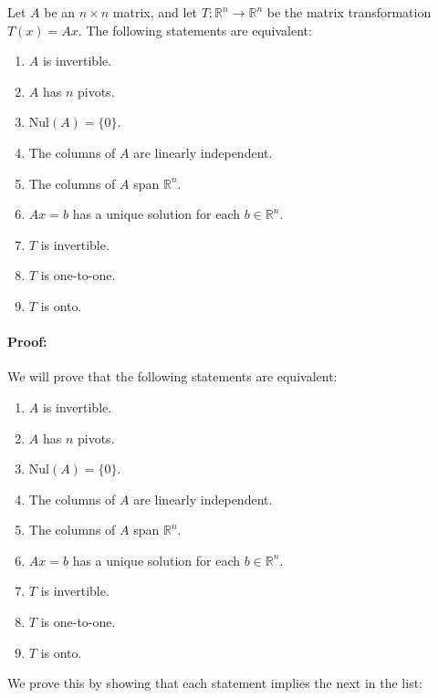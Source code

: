 \documentclass[a4paper,12pt]{article}
\begin{document}
\begin{tcolorbox}[title=Definition,colframe=blue!70!black, colback=blue!5!white]
Let \( A \) be an \( n \times n \) matrix, and let \( T: \mathbb{R}^n \to \mathbb{R}^n \) be the matrix transformation \( T(x) = Ax \). The following statements are equivalent:

\begin{enumerate}
    \item \( A \) is invertible.
    \item \( A \) has \( n \) pivots.
    \item \( \text{Nul}(A) = \{0\} \).
    \item The columns of \( A \) are linearly independent.
    \item The columns of \( A \) span \( \mathbb{R}^n \).
    \item \( Ax = b \) has a unique solution for each \( b \in \mathbb{R}^n \).
    \item \( T \) is invertible.
    \item \( T \) is one-to-one.
    \item \( T \) is onto.
\end{enumerate}
\end{tcolorbox}
\paragraph{Proof:}We will prove that the following statements are equivalent:

\begin{enumerate}
    \item \( A \) is invertible.
    \item \( A \) has \( n \) pivots.
    \item \( \text{Nul}(A) = \{0\} \).
    \item The columns of \( A \) are linearly independent.
    \item The columns of \( A \) span \( \mathbb{R}^n \).
    \item \( Ax = b \) has a unique solution for each \( b \in \mathbb{R}^n \).
    \item \( T \) is invertible.
    \item \( T \) is one-to-one.
    \item \( T \) is onto.
\end{enumerate}

We prove this by showing that each statement implies the next in the list:
\end{document}
